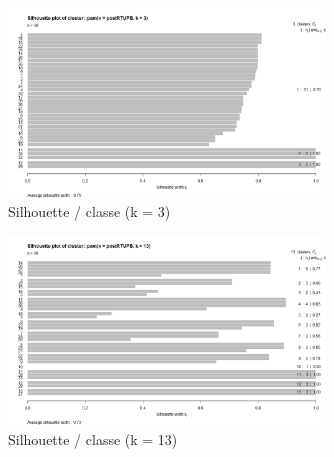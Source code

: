 \begin{figure}[H]
\centering
\includegraphics[width=0.75\textwidth]{../Fig/RTUPB/rtupb-sil-k3-post.png}
\caption{Silhouette / classe (k = 3)}
\end{figure}

\begin{figure}[H]
\centering
\includegraphics[width=0.75\textwidth]{../Fig/RTUPB/rtupb-sil-k13-post.png}
\caption{Silhouette / classe (k = 13)}
\end{figure}




%
